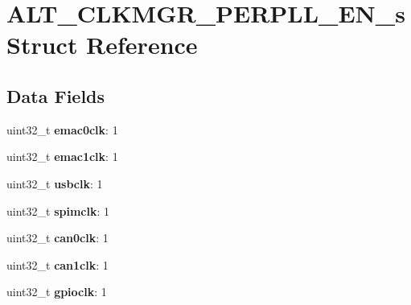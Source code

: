 \hypertarget{structALT__CLKMGR__PERPLL__EN__s}{}\section{A\+L\+T\+\_\+\+C\+L\+K\+M\+G\+R\+\_\+\+P\+E\+R\+P\+L\+L\+\_\+\+E\+N\+\_\+s Struct Reference}
\label{structALT__CLKMGR__PERPLL__EN__s}
\subsection*{Data Fields}
\begin{DoxyCompactItemize}
\item 
\mbox{\label{structALT__CLKMGR__PERPLL__EN__s_a2efec91ae75fdaf607921186aae7908f}} 
uint32\+\_\+t {\bfseries emac0clk}\+: 1
\item 
\mbox{\label{structALT__CLKMGR__PERPLL__EN__s_a422045cdeb131ddd973cfc6b81ca0651}} 
uint32\+\_\+t {\bfseries emac1clk}\+: 1
\item 
\mbox{\label{structALT__CLKMGR__PERPLL__EN__s_a83bb5e94208d1c80e2a45da3e474a298}} 
uint32\+\_\+t {\bfseries usbclk}\+: 1
\item 
\mbox{\label{structALT__CLKMGR__PERPLL__EN__s_a6282ef7823d1dae8ed69c4e0f8f80163}} 
uint32\+\_\+t {\bfseries spimclk}\+: 1
\item 
\mbox{\label{structALT__CLKMGR__PERPLL__EN__s_aa4c143a1bf2263aa291a4283c7eaf399}} 
uint32\+\_\+t {\bfseries can0clk}\+: 1
\item 
\mbox{\label{structALT__CLKMGR__PERPLL__EN__s_aff80dcb055583c5761c85c9cf7214b70}} 
uint32\+\_\+t {\bfseries can1clk}\+: 1
\item 
\mbox{\label{structALT__CLKMGR__PERPLL__EN__s_a979f26f0913e171f8507fbcbab269875}} 
uint32\+\_\+t {\bfseries gpioclk}\+: 1
\item 
\mbox{\label{structALT__CLKMGR__PERPLL__EN__s_aa80675a73fd3ea44182b5bbad642be8e}} 

\end{DoxyCompactItemize}
